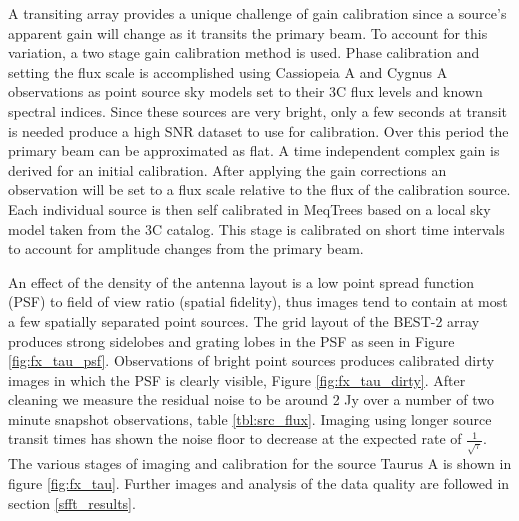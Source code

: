 \documentclass[useAMS,macros,usenatbib]{mn2e}
\begin{document}
A transiting array provides a unique challenge of gain calibration since a source's apparent gain will change as it transits the primary beam.
To account for this variation, a two stage gain calibration method is used.
Phase calibration and setting the flux scale is accomplished using Cassiopeia A and Cygnus A observations as point source sky models set to their 3C flux levels and known spectral indices.
Since these sources are very bright, only a few seconds at transit is needed produce a high SNR dataset to use for calibration.
Over this period the primary beam can be approximated as flat.
A time independent complex gain is derived for an initial calibration.
After applying the gain corrections an observation will be set to a flux scale relative to the flux of the calibration source.
Each individual source is then self calibrated in MeqTrees\citep{meqtrees} based on a local sky model taken from the 3C catalog.
This stage is calibrated on short time intervals to account for amplitude changes from the primary beam.

An effect of the density of the antenna layout is a low point spread function (PSF) to field of view ratio (spatial fidelity), thus images tend to contain at most a few spatially separated point sources.
The grid layout of the BEST-2 array produces strong sidelobes and grating lobes in the PSF as seen in Figure \ref{fig:fx_tau_psf}.
Observations of bright point sources produces calibrated dirty images in which the PSF is clearly visible, Figure \ref{fig:fx_tau_dirty}.
After cleaning we measure the residual noise to be around 2 Jy over a number of two minute snapshot observations, table \ref{tbl:src_flux}.
Imaging using longer source transit times has shown the noise floor to decrease at the expected rate of $\frac{1}{\sqrt{\tau}}$.
The various stages of imaging and calibration for the source Taurus A is shown in figure \ref{fig:fx_tau}.
Further images and analysis of the data quality are followed in section \ref{sfft_results}.
\end{document}
